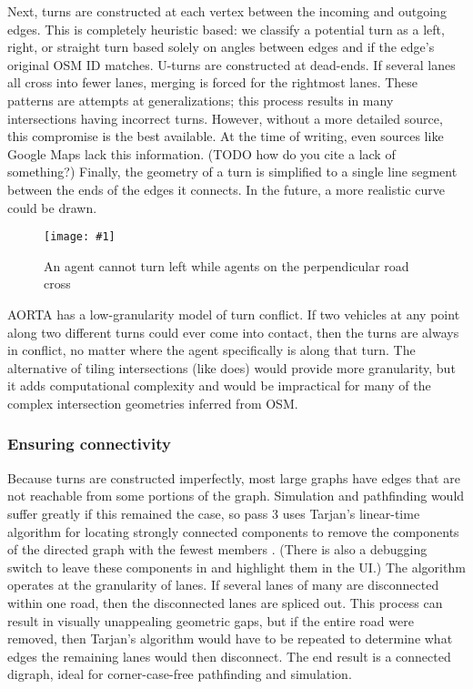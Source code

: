 \documentclass[letterpaper, 10 pt, conference]{ieeeconf}  %
\newcommand{\pix}[3]{
  \begin{figure}[h]
    \centering \texttt{[image: \#1]}
    \caption{#2}
  \end{figure}
}
\begin{document}
Next, turns are constructed at each vertex between the incoming and outgoing
edges. This is completely heuristic based: we  classify a potential turn as a
left, right, or straight turn based solely on angles between edges and if the
edge's original OSM ID matches. U-turns are constructed at dead-ends. If several
lanes all cross into fewer lanes, merging is forced for the rightmost lanes.
These patterns are attempts at generalizations; this process results in many
intersections having incorrect turns. However, without a more detailed
source, this compromise is the best available. At the time of writing, even sources like
Google Maps lack this information. (TODO how do you cite a lack of
something?)
Finally, the geometry of a turn is simplified to a single line segment
between the ends
of the edges it connects.  In the future, a more realistic curve could be drawn.

\pix{turn_conflicts.png}
    {An agent cannot turn left while agents on the perpendicular road cross}
    {scale=0.5}

 AORTA has a low-granularity model of turn conflict. If two vehicles at any point
along two different turns could ever come into contact, then the turns are
always in conflict, no matter where the agent specifically is along that turn.
The alternative of tiling intersections (like \cite{JAIR08-dresner}  does) would
provide more granularity, but it adds computational complexity and would be
impractical for many of the complex intersection geometries inferred from OSM.

\subsubsection{Ensuring connectivity}

Because turns are constructed imperfectly, most large graphs have edges that are
not reachable from some portions of the graph. Simulation and pathfinding would
suffer greatly if this remained the case, so pass 3 uses Tarjan's linear-time
algorithm for locating strongly connected components to remove the components of
the directed graph with the fewest members . (There is also a debugging switch to
leave these components in and highlight them in the UI.) The algorithm operates
at the granularity of lanes. If several lanes of many are disconnected within
one road, then the disconnected lanes are spliced out. This process
can result in visually
unappealing geometric gaps, but if the entire road were removed, then Tarjan's
algorithm would have to be repeated to determine what edges the remaining lanes would
then disconnect. The end result is a connected digraph, ideal for corner-case-free pathfinding and simulation.
\end{document}
